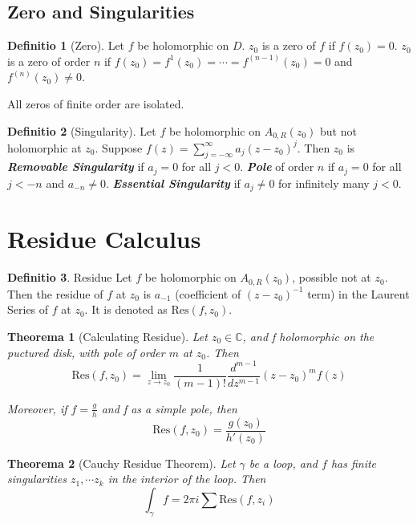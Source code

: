 \documentclass[12pt, a4paper]{article}
\newtheorem{theorem}{Theorema}[section]
\theoremstyle{definition}
\newtheorem{definition}{Definitio}[section]
\theoremstyle{remark}
\newcommand{\bb}[1]{\mathbb{#1}}
\newcommand{\res}{\text{Res}}
\renewcommand{\emph}[1]{\textbf{\textit{#1}}}
\begin{document}
\subsection{Zero and Singularities}
\begin{definition}[Zero]
	Let $f$ be holomorphic on $D$. $z_0$ is a zero of $f$ if $f(z_0) = 0$. $z_0$ is a zero of order $n$ if $f(z_0) = f^{1}(z_0) = \cdots = f^{(n-1)}(z_0) = 0$ and $f^{(n)}(z_0) \neq 0$.
\end{definition}

All zeros of finite order are isolated.

\begin{definition}[Singularity]
	Let $f$ be holomorphic on $A_{0,R} (z_0)$ but not holomorphic at $z_0$. Suppose $f(z) = \sum^{\infty}_{j = - \infty} a_j(z-z_0)^j$. Then $z_0$ is 
	\emph{Removable Singularity} if $a_j = 0$ for all $j < 0$. 
	\emph{Pole} of order $n$ if $a_j = 0$ for all $j < -n$ and $a_{-n} \neq 0$.
	\emph{Essential Singularity} if $a_j \neq 0$ for infinitely many $j < 0$.
\end{definition}

\section{Residue Calculus}

\begin{definition}{Residue}
	Let $f$ be holomorphic on $A_{0,R}(z_0)$, possible not at $z_0$. Then the residue of $f$ at $z_0$ is $a_{-1}$ (coefficient of $(z-z_0)^{-1}$ term) in the Laurent Series of $f$ at $z_0$. It is denoted as $\res(f, z_0)$.
\end{definition}

\begin{theorem}[Calculating Residue]
  Let $z_0 \in \bb{C}$, and f holomorphic on the puctured disk, with pole of order $m$ at $z_0$. Then 
  \[
    \res(f, z_0) = \lim _{z \rightarrow z_0} \frac{1}{(m-1)!} \frac{d^{m-1}}{dz^{m-1}}(z-z_0)^mf(z)
  \]

  Moreover, if $f = \frac{g}{h}$ and f as a simple pole, then 
  \[
    \res(f, z_0) = \frac{g(z_0)}{h'(z_0)}
  \]
\end{theorem}

\begin{theorem}[Cauchy Residue Theorem]
  Let $\gamma$ be a loop, and $f$ has finite singularities $z_1, \cdots z_k$ in the interior of the loop. Then 
  \[
    \int_{\gamma} f = 2\pi i \sum \res(f, z_i)
  \]
\end{theorem}
\end{document}
